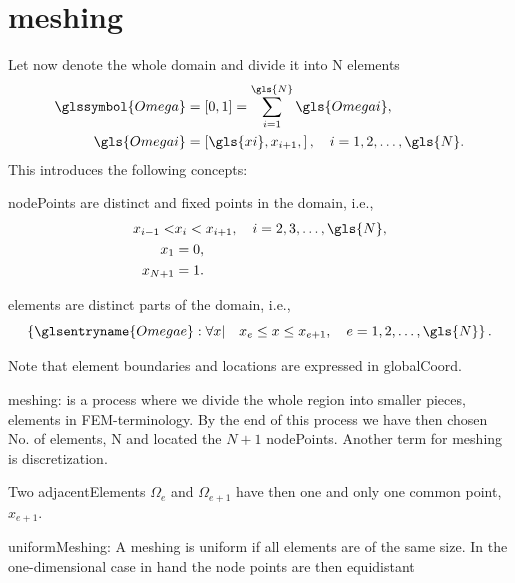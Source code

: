 \section[Meshing]{\Gls{meshing}}
Let now  denote the whole \gls{domain} and divide it into \gls{N} elements
\begin{subequations} \label{eqn:Element_Locations}
	\begin{align}
		\glssymbol{Omega} &= \left[ 0, 1 \right] = \sum \limits_{i = 1}^{\gls{N}} \gls{Omegai}, \label{eqn:Whole_Region}	\\
		\gls{Omegai} &= \left[ \gls{xi},  x_{i + 1}, \right], \quad i = 1, 2, \dots, \gls{N}.	\label{eqn:Element_No_i}
	\end{align}
\end{subequations}
%
This introduces the following concepts:
\begin{definition}
	\Glspl{nodePoint} are distinct and fixed points in the \gls{domain}, i.e.,
	\begin{align}
		x_{i - 1} < & x_{i} < x_{i + 1}, \quad i = 2, 3, \dots, \gls{N}, \\
		x_1  & = 0, \\
		x_{N + 1} & = 1.
	\end{align}
\end{definition}
\begin{definition}
	\Glspl{element} are distinct parts of the \gls{domain}, i.e.,
	\begin{equation}
		\left\{ \glsentryname{Omegae}: \forall x \vert \quad x_{e} \le x \le x_{e + 1}, \quad e = 1, 2, \dots, \gls{N} \right\} .
	\end{equation}
\end{definition}
Note that element boundaries and locations are expressed in \gls{globalCoord}.
\begin{definition}
	\Gls{meshing}: is a process where we divide the whole region
	into smaller pieces, elements in \gls{FEM}-terminology. By the end of this process we have then chosen No. of elements, \gls{N} and
	located the $N + 1$ \glspl{nodePoint}. Another term for \gls{meshing} is \gls{discretization}.
\end{definition}
\begin{remark}
	Two \gls{adjacentElements} $\Omega_e$ and $\Omega_{e + 1}$ have then one and only one common point, $x_{e + 1}$.
\end{remark}
\begin{definition}
	\Gls{uniformMeshing}: A \gls{meshing} is uniform if all \glspl{element} are of the same size. In the one-dimensional case in
	hand the node points are then equidistant
\end{definition}
